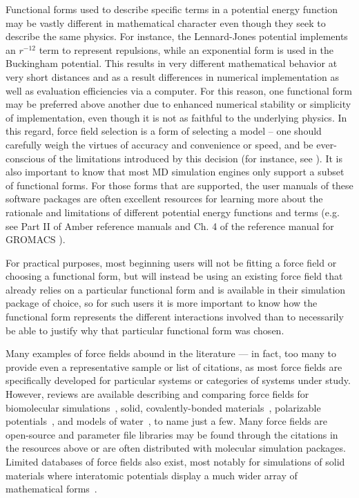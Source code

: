 \documentclass[9pt,bestpractices]{livecoms}
\begin{document}
Functional forms used to describe specific terms in a potential energy function may be vastly different in mathematical character even though they seek to describe the same physics.
For instance, the Lennard-Jones potential implements an $r^{-12}$ term to represent repulsions, while an exponential form is used in the Buckingham potential.
This results in very different mathematical behavior at very short distances and as a result differences in numerical implementation as well as evaluation efficiencies via a computer.
For this reason, one functional form may be preferred above another due to  enhanced numerical stability or simplicity of implementation, even though it is not as faithful to the underlying physics.
In this regard, force field selection is a form of selecting a model -- one should carefully weigh the virtues of accuracy and convenience or speed, and be ever-conscious of the limitations introduced by this decision (for instance, see \citet{Becker2013}).
It is also important to know that most MD simulation engines only support a subset of functional forms.
For those forms that are supported, the user manuals of these software packages are often excellent resources for learning more about the rationale and limitations of different potential energy functions and terms (e.g. see Part II of Amber reference manuals\citep{AmberManual} and Ch. 4 of the reference manual for GROMACS \citep{GROMACSManual}).

For practical purposes, most beginning users will not be fitting a force field or choosing a functional form, but will instead be using an existing force field that already relies on a particular functional form and is available in their simulation package of choice, so for such users it is more important to know how the functional form represents the different interactions involved than to necessarily be able to justify why that particular functional form was chosen.

Many examples of force fields abound in the literature --- in fact, too many to provide even a representative sample or list of citations, as most force fields are specifically developed for particular systems or categories of systems under study.
However, reviews are available describing and comparing force fields for biomolecular simulations~\citep{Ponder2003, Riniker2018}, solid, covalently-bonded materials~\citep{Mishra2017}, polarizable potentials~\citep{Lopes2009}, and models of water~\citep{Onufriev2018, Vega2011}, to name just a few. 
Many force fields are open-source and parameter file libraries may be found through the citations in the resources above or are often distributed with molecular simulation packages. 
Limited databases of force fields also exist, most notably for simulations of solid materials where interatomic potentials display a much wider array of mathematical forms~\citep{openKIM, IPRnist}.
\end{document}
